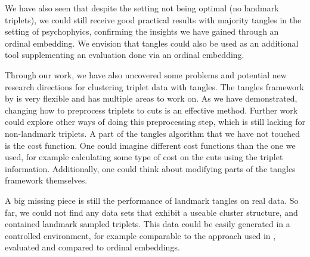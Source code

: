 We have also seen that despite the setting not being optimal (no landmark triplets), we could still receive good practical results with majority tangles in the setting of psychophyics, 
confirming the insights we have gained through an ordinal embedding. We envision that tangles could also be used as an additional tool supplementing an evaluation done via an ordinal embedding. 

Through our work, we have also uncovered some problems and potential new research directions for clustering triplet data with tangles. 
The tangles framework by \cite{klepperClusteringTanglesAlgorithmic2021} is very flexible and has multiple areas to work on. As we have demonstrated, changing how to 
preprocess triplets to cuts is an effective method. Further work could explore other ways of doing this preprocessing step, which is still lacking for non-landmark triplets. 
A part of the tangles algorithm that we have not touched is the cost function. One could imagine different cost functions than the one we used, for example calculating some 
type of cost on the cuts using the triplet information. Additionally, one could think about modifying parts of the tangles framework themselves.

A big missing piece is still the performance of landmark tangles on real data. So far, we could not find any data sets that exhibit a useable cluster structure, and contained landmark sampled 
triplets. This data could be easily generated in a controlled environment, for example comparable to the approach used in \cite{inesschonmannSimilarityJudgementsNatural2021}, evaluated and compared
to ordinal embeddings. 
